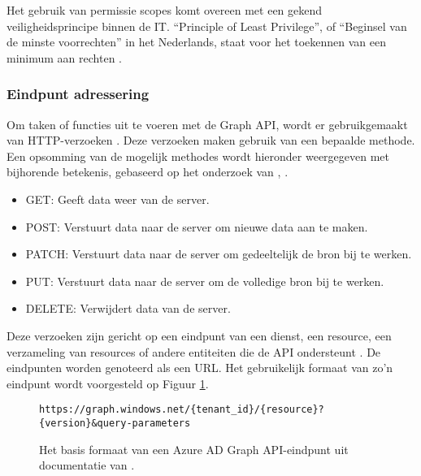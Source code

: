 Het gebruik van permissie scopes komt overeen met een gekend veiligheidsprincipe binnen de \ac{IT}. “Principle of Least Privilege”, of “Beginsel van de minste voorrechten” in het Nederlands, staat voor het toekennen van een minimum aan rechten \autocite{Saltzer1975}. 



\subsubsection{Eindpunt adressering}


Om taken of functies uit te voeren met de Graph \ac{API}, wordt er gebruikgemaakt van \ac{HTTP}-verzoeken \autocite{Microsoft2015}. Deze verzoeken maken gebruik van een bepaalde methode. Een opsomming van de mogelijk methodes wordt hieronder weergegeven met bijhorende betekenis, gebaseerd op het onderzoek van \textcite{Fielding1999}, \textcite{Dusseault2010}.

\begin{itemize}
    \item GET: Geeft data weer van de server.
    \item POST: Verstuurt data naar de server om nieuwe data aan te maken.
    \item PATCH: Verstuurt data naar de server om gedeeltelijk de bron bij te werken.
    \item PUT: Verstuurt data naar de server om de volledige bron bij te werken.
    \item DELETE: Verwijdert data van de server.
\end{itemize}

Deze verzoeken zijn gericht op een eindpunt van een dienst, een resource, een verzameling van resources of andere entiteiten die de \ac{API} ondersteunt \autocite{Microsoft2015}. De eindpunten worden genoteerd als een \ac{URL}. Het gebruikelijk formaat van zo'n eindpunt wordt voorgesteld op Figuur \ref{bfe}. \\

\begin{figure}[h]
    \scriptsize\begin{verbatim}https://graph.windows.net/{tenant_id}/{resource}?{version}&query-parameters
    \end{verbatim}    
    \caption[Basis formaat Graph API-eindpunt]{Het basis formaat van een Azure \ac{AD} Graph \ac{API}-eindpunt uit documentatie van \textcite{Microsoft2023o}.}
    \label{bfe}
\end{figure}

